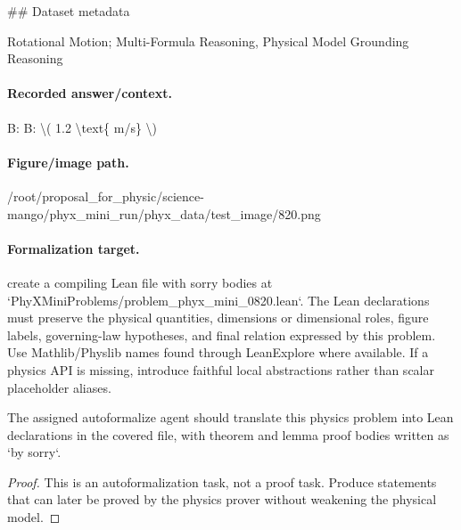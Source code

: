 \#\# Dataset metadata

Rotational Motion; Multi-Formula Reasoning, Physical Model Grounding Reasoning

\paragraph{Recorded answer/context.}
B: B: \textbackslash{}( 1.2 \textbackslash{}text\{ m/s\} \textbackslash{})

\paragraph{Figure/image path.}
/root/proposal\_for\_physic/science-mango/phyx\_mini\_run/phyx\_data/test\_image/820.png

\paragraph{Formalization target.}
create a compiling Lean file with sorry bodies at `PhyXMiniProblems/problem\_phyx\_mini\_0820.lean`. The Lean declarations must preserve the physical quantities, dimensions or dimensional roles, figure labels, governing-law hypotheses, and final relation expressed by this problem.
Use Mathlib/Physlib names found through LeanExplore where available. If a physics API is missing, introduce faithful local abstractions rather than scalar placeholder aliases.

\begin{theorem}
\label{thm:physics:phyx_mini_0820:target}
The assigned autoformalize agent should translate this physics problem into Lean declarations in the covered file, with theorem and lemma proof bodies written as `by sorry`.
\end{theorem}
\begin{proof}
This is an autoformalization task, not a proof task. Produce statements that can later be proved by the physics prover without weakening the physical model.
\end{proof}

